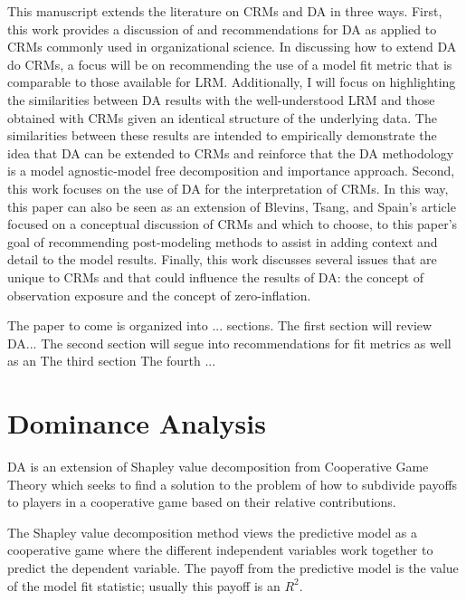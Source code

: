 \documentclass[ShortAfour,times,sageapa]{sagej}
\begin{document}
	This manuscript extends the literature on CRMs and DA in three ways.
	First, this work provides a discussion of and recommendations for DA as applied to CRMs commonly used in organizational science.
	In discussing how to extend DA do CRMs, a focus will be on recommending the use of a model fit metric that is comparable to those available for LRM.
	Additionally, I will focus on highlighting the similarities between DA results with the well-understood LRM and those obtained with CRMs given an identical structure of the underlying data.
	The similarities between these results are intended to empirically demonstrate the idea that DA can be extended to CRMs and reinforce that the DA methodology is a model agnostic-model free decomposition and importance approach.
	Second, this work focuses on the use of DA for the interpretation of CRMs.  
	In this way, this paper can also be seen as an extension of Blevins, Tsang, and Spain's \cite{blevins2015count} article focused on a conceptual discussion of CRMs and which to choose, to this paper's goal of recommending post-modeling methods to assist in adding context and detail to the model results. %
	Finally, this work discusses several issues that are unique to CRMs and that could influence the results of DA: the concept of observation exposure and the concept of zero-inflation.
	
	The paper to come is organized into ... sections.  
	The first section will review DA...
	The second section will segue into recommendations for fit metrics as well as an %
	The third section %
	The fourth %
	...
		
\section{Dominance Analysis}
	
	DA is an extension of Shapley value decomposition from Cooperative Game Theory %
	\cite{} which seeks to find a solution to the problem of how to subdivide payoffs to players in a cooperative game based on their relative contributions.
	
	The Shapley value decomposition method views the predictive model as a cooperative game where the different independent variables work together to predict the dependent variable.  
	The payoff from the predictive model is the value of the model fit statistic; usually this payoff is an $R^2$. %
	
\end{document}
